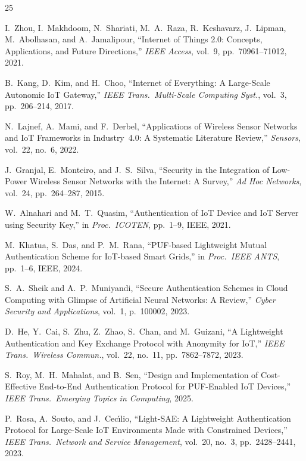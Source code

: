 \documentclass[conference]{IEEEtran}
\begin{document}
\balance
\begin{thebibliography}{25}

I.~Zhou, I.~Makhdoom, N.~Shariati, M.~A.~Raza, R.~Keshavarz, J.~Lipman,
M.~Abolhasan, and A.~Jamalipour,
``Internet of Things 2.0: Concepts, Applications, and Future Directions,''
\emph{IEEE Access}, vol.~9, pp.~70961--71012, 2021.

B.~Kang, D.~Kim, and H.~Choo,
``Internet of Everything: A Large-Scale Autonomic IoT Gateway,''
\emph{IEEE Trans.\ Multi-Scale Computing Syst.}, vol.~3, pp.~206--214, 2017.

N.~Lajnef, A.~Mami, and F.~Derbel,
``Applications of Wireless Sensor Networks and IoT Frameworks in Industry~4.0:
A Systematic Literature Review,''
\emph{Sensors}, vol.~22, no.~6, 2022.

J.~Granjal, E.~Monteiro, and J.~S.~Silva,
``Security in the Integration of Low-Power Wireless Sensor Networks with the
Internet: A Survey,''
\emph{Ad Hoc Networks}, vol.~24, pp.~264--287, 2015.

W.~Alnahari and M.~T.~Quasim,
``Authentication of IoT Device and IoT Server using Security Key,''
in \emph{Proc.\ ICOTEN}, pp.~1--9, IEEE, 2021.

M.~Khatua, S.~Das, and P.~M.~Rana,
``PUF-based Lightweight Mutual Authentication Scheme for IoT-based Smart
Grids,''
in \emph{Proc.\ IEEE ANTS}, pp.~1--6, IEEE, 2024.

S.~A.~Sheik and A.~P.~Muniyandi,
``Secure Authentication Schemes in Cloud Computing with Glimpse of Artificial
Neural Networks: A Review,''
\emph{Cyber Security and Applications}, vol.~1, p.~100002, 2023.

D.~He, Y.~Cai, S.~Zhu, Z.~Zhao, S.~Chan, and M.~Guizani,
``A Lightweight Authentication and Key Exchange Protocol with Anonymity for
IoT,''
\emph{IEEE Trans.\ Wireless Commun.}, vol.~22, no.~11, pp.~7862--7872, 2023.

S.~Roy, M.~H.~Mahalat, and B.~Sen,
``Design and Implementation of Cost-Effective End-to-End Authentication
Protocol for PUF-Enabled IoT Devices,''
\emph{IEEE Trans.\ Emerging Topics in Computing}, 2025.

P.~Rosa, A.~Souto, and J.~Cec\'{\i}lio,
``Light-SAE: A Lightweight Authentication Protocol for Large-Scale IoT
Environments Made with Constrained Devices,''
\emph{IEEE Trans.\ Network and Service Management}, vol.~20, no.~3,
pp.~2428--2441, 2023.


\end{thebibliography}
\end{document}
